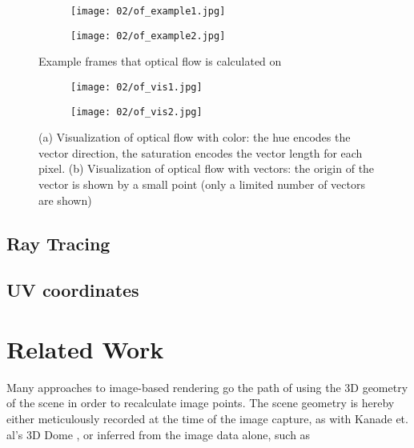 \begin{figure}
\centering
    \begin{subfigure}[b]{0.5\textwidth}            
            \centering
            \texttt{[image: 02/of\_example1.jpg]}
            \caption{}
    \end{subfigure}%
    \begin{subfigure}[b]{0.5\textwidth}
            \centering
            \texttt{[image: 02/of\_example2.jpg]}
            \caption{}
    \end{subfigure}
    \caption[Optical flow example]{Example frames that optical flow is calculated on}\label{fig:of_example_bike}

    \quad
    \begin{subfigure}[b]{0.5\textwidth}            
            \centering
            \texttt{[image: 02/of\_vis1.jpg]}
            \caption{}
    \end{subfigure}%
    \begin{subfigure}[b]{0.5\textwidth}
            \centering
            \texttt{[image: 02/of\_vis2.jpg]}
            \caption{}
    \end{subfigure}
    \caption[Optical flow visualizations]{(a) Visualization of optical flow with color: the hue encodes the vector direction, the saturation encodes the vector length for each pixel. (b) Visualization of optical flow with vectors: the origin of the vector is shown by a small point (only a limited number of vectors are shown)}\label{fig:of_vis}
\end{figure}

\subsection{Ray Tracing}
\subsection{UV coordinates}

\section{Related Work}
Many approaches to image-based rendering go the path of using the 3D geometry of the scene in order to recalculate image points. The scene geometry is hereby either meticulously recorded at the time of the image capture, as with Kanade et. al's 3D Dome \cite{geometry97}, or inferred from the image data alone, such as 


